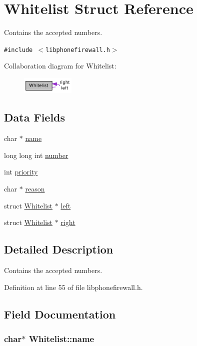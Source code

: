 \hypertarget{structWhitelist}{
\section{Whitelist Struct Reference}
\label{structWhitelist}
}
Contains the accepted numbers.  


{\tt \#include $<$libphonefirewall.h$>$}

Collaboration diagram for Whitelist:\nopagebreak
\begin{figure}[H]
\begin{center}
\leavevmode
\includegraphics[width=71pt]{structWhitelist__coll__graph}
\end{center}
\end{figure}
\subsection*{Data Fields}
\begin{CompactItemize}
\item 
char $\ast$ \hyperlink{structWhitelist_cf7f59535ba0988817c45bd3c16b34d0}{name}
\item 
long long int \hyperlink{structWhitelist_b6be6094565f6cafd60edf5573ade306}{number}
\item 
int \hyperlink{structWhitelist_a88dab00804dbe50d9255e0fa75d1438}{priority}
\item 
char $\ast$ \hyperlink{structWhitelist_22d667946147519356f386dee8a05a17}{reason}
\item 
struct \hyperlink{structWhitelist}{Whitelist} $\ast$ \hyperlink{structWhitelist_954a1d648ca2342328577e06b98385ba}{left}
\item 
struct \hyperlink{structWhitelist}{Whitelist} $\ast$ \hyperlink{structWhitelist_2600043be14c3f8e10d3939afe796d58}{right}
\end{CompactItemize}


\subsection{Detailed Description}
Contains the accepted numbers. 

Definition at line 55 of file libphonefirewall.h.

\subsection{Field Documentation}
\hypertarget{structWhitelist_cf7f59535ba0988817c45bd3c16b34d0}{
\subsubsection{\setlength{\rightskip}{0pt plus 5cm}char$\ast$ {\bf Whitelist::name}}}
\label{structWhitelist_cf7f59535ba0988817c45bd3c16b34d0}




